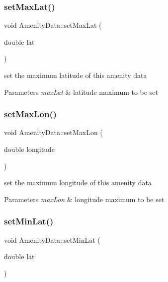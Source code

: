 \subsubsection{\texorpdfstring{set\+Max\+Lat()}{setMaxLat()}}
{\footnotesize\ttfamily void Amenity\+Data\+::set\+Max\+Lat (\begin{DoxyParamCaption}\item[{double}]{lat }\end{DoxyParamCaption})\hspace{0.3cm}{\ttfamily [inline]}}

set the maximum latitude of this amenity data 
\begin{DoxyParams}{Parameters}
{\em max\+Lat} & latitude maximum to be set \\
\hline
\end{DoxyParams}
\mbox{\label{class_amenity_data_a5df67f0745f59cda002d7924f7ec545c}} 
\subsubsection{\texorpdfstring{set\+Max\+Lon()}{setMaxLon()}}
{\footnotesize\ttfamily void Amenity\+Data\+::set\+Max\+Lon (\begin{DoxyParamCaption}\item[{double}]{longitude }\end{DoxyParamCaption})\hspace{0.3cm}{\ttfamily [inline]}}

set the maximum longitude of this amenity data 
\begin{DoxyParams}{Parameters}
{\em max\+Lon} & longitude maximum to be set \\
\hline
\end{DoxyParams}
\mbox{\label{class_amenity_data_a49fd48c6e7a7d69d7e9663c859455197}} 
\subsubsection{\texorpdfstring{set\+Min\+Lat()}{setMinLat()}}
{\footnotesize\ttfamily void Amenity\+Data\+::set\+Min\+Lat (\begin{DoxyParamCaption}\item[{double}]{lat }\end{DoxyParamCaption})\hspace{0.3cm}{\ttfamily [inline]}}

